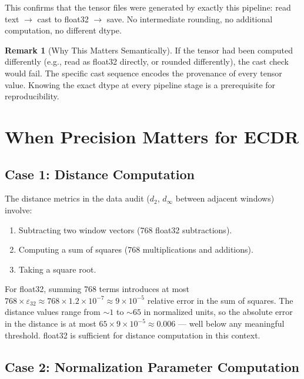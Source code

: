 \documentclass[11pt, a4paper]{article}
\theoremstyle{definition}
\newtheorem{remark}{Remark}[section]
\theoremstyle{plain}
\newcommand{\eps}{\varepsilon}
\begin{document}
This confirms that the tensor files were generated by exactly this pipeline:
read text $\to$ cast to float32 $\to$ save. No intermediate rounding, no
additional computation, no different dtype.

\begin{remark}[Why This Matters Semantically]
  If the tensor had been computed differently (e.g., read as float32 directly,
  or rounded differently), the cast check would fail. The specific cast sequence
  encodes the provenance of every tensor value. Knowing the exact dtype at every
  pipeline stage is a prerequisite for reproducibility.
\end{remark}

\section{When Precision Matters for ECDR}

\subsection{Case 1: Distance Computation}

The distance metrics in the data audit ($d_2$, $d_\infty$ between adjacent windows)
involve:
\begin{enumerate}[leftmargin=1.5em]
  \item Subtracting two window vectors (768 float32 subtractions).
  \item Computing a sum of squares (768 multiplications and additions).
  \item Taking a square root.
\end{enumerate}

For float32, summing 768 terms introduces at most $768 \times \eps_{32} \approx
768 \times 1.2 \times 10^{-7} \approx 9 \times 10^{-5}$ relative error in the
sum of squares. The distance values range from $\sim 1$ to $\sim 65$ in normalized
units, so the absolute error in the distance is at most $65 \times 9 \times 10^{-5}
\approx 0.006$ — well below any meaningful threshold. float32 is sufficient for
distance computation in this context.

\subsection{Case 2: Normalization Parameter Computation}
\end{document}

